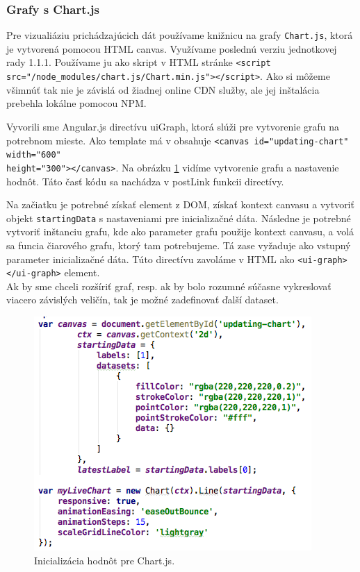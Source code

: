 \subsubsection{Grafy s Chart.js}
Pre vizualiáziu prichádzajúcich dát používame knižnicu na grafy \verb|Chart.js|, ktorá je vytvorená pomocou HTML canvas. Využívame poslednú verziu jednotkovej rady 1.1.1. Používame ju ako skript v HTML stránke \verb|<script src="/node_modules/chart.js/Chart.min.js"></script>|. Ako si môžeme všimnúť tak nie je závislá od žiadnej online CDN služby, ale jej inštalácia prebehla lokálne pomocou NPM.

Vyvorili sme Angular.js directívu uiGraph, ktorá slúži pre vytvorenie grafu na potrebnom mieste. Ako template má v obsahuje \verb|<canvas id="updating-chart" width="600"| \\ \verb|height="300"></canvas>|. Na obrázku \ref{img-angular-chartjs-canvas} vidíme vytvorenie grafu a nastavenie hodnôt. Táto časť kódu sa nachádza v postLink funkcii directívy.

Na začiatku je potrebné získať element z DOM, získať kontext canvasu a vytvoriť objekt \verb|startingData| s nastaveniami pre inicializačné dáta. 
Následne je potrebné vytvoriť inštanciu grafu, kde ako parameter grafu použije kontext canvasu, a volá sa funcia čiarového grafu, ktorý tam potrebujeme. Tá zase vyžaduje ako vstupný parameter inicializačné dáta. Túto directívu zavoláme v HTML ako \verb|<ui-graph></ui-graph>| element.\\

Ak by sme chceli rozšíriť graf, resp. ak by bolo rozumné súčasne vykreslovať viacero závislých veličín, tak je možné zadefinovať ďalší dataset.

\begin{figure}[H]
  \centering
  \includegraphics[scale=0.7]{img/code/angular-chartjs-code.png}
  \caption{Inicializácia hodnôt pre Chart.js.}
  \label{img-angular-chartjs-canvas}
\end{figure}

